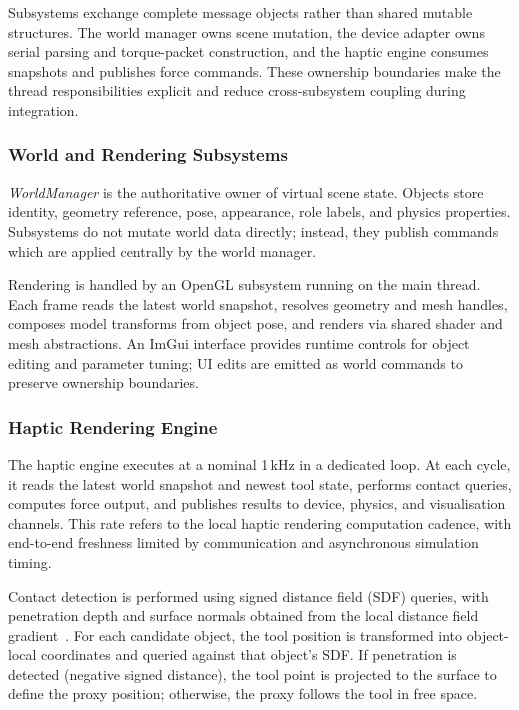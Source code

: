 Subsystems exchange complete message objects rather than shared mutable structures. The world manager owns scene mutation, the device adapter owns serial parsing and torque-packet construction, and the haptic engine consumes snapshots and publishes force commands. These ownership boundaries make the thread responsibilities explicit and reduce cross-subsystem coupling during integration.

\subsubsection{World and Rendering Subsystems}

\textit{WorldManager} is the authoritative owner of virtual scene state. Objects store identity, geometry reference, pose, appearance, role labels, and physics properties. Subsystems do not mutate world data directly; instead, they publish commands which are applied centrally by the world manager.

Rendering is handled by an OpenGL subsystem running on the main thread. Each frame reads the latest world snapshot, resolves geometry and mesh handles, composes model transforms from object pose, and renders via shared shader and mesh abstractions. An ImGui interface provides runtime controls for object editing and parameter tuning; UI edits are emitted as world commands to preserve ownership boundaries.

\subsubsection{Haptic Rendering Engine}

The haptic engine executes at a nominal 1\,kHz in a dedicated loop. At each cycle, it reads the latest world snapshot and newest tool state, performs contact queries, computes force output, and publishes results to device, physics, and visualisation channels. This rate refers to the local haptic rendering computation cadence, with end-to-end freshness limited by communication and asynchronous simulation timing.

Contact detection is performed using signed distance field (SDF) queries, with penetration depth and surface normals obtained from the local distance field gradient~\cite{ericsonRealTimeCollisionDetection2004}. For each candidate object, the tool position is transformed into object-local coordinates and queried against that object's SDF. If penetration is detected (negative signed distance), the tool point is projected to the surface to define the proxy position; otherwise, the proxy follows the tool in free space.

